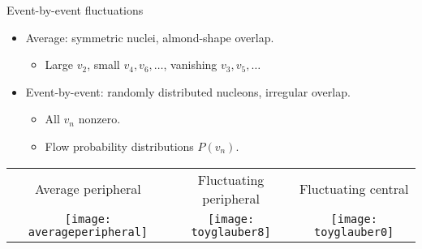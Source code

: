 \documentclass{beamer}
\begin{document}
\begin{frame}{Event-by-event fluctuations}
  \begin{itemize}
    \item Average:  symmetric nuclei, almond-shape overlap.
      \begin{itemize}
        \item Large $v_2$, small $v_4,v_6,\ldots$, vanishing $v_3,v_5,\ldots$
      \end{itemize}
    \item Event-by-event:  randomly distributed nucleons, irregular overlap.
      \begin{itemize}
        \item All $v_n$ nonzero.
        \item Flow probability distributions $P(v_n)$.
      \end{itemize}
  \end{itemize}

  \mds

  \hspace*{-6mm}
  \begin{tabular}{ccc}
    Average peripheral & Fluctuating peripheral & Fluctuating central \\
    \texttt{[image: averageperipheral]} &
    \texttt{[image: toyglauber8]} &
    \texttt{[image: toyglauber0]}
  \end{tabular}
\end{frame}


\end{document}
